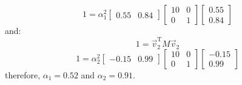 \documentclass[12pt,letter]{article}
\begin{document}
\begin{example}
	\begin{equation}
	1 = \alpha_1^2 \begin{bmatrix} 0.55 &  0.84 \end{bmatrix} \begin{bmatrix} 10 & 0 \\    0  & 1 \end{bmatrix}  \begin{bmatrix} 0.55 \\  0.84 \end{bmatrix}
	\end{equation}
	and:
	\begin{equation}
	1 = \vec{v}_2^\text{T} M \vec{v}_2 
	\end{equation}
	\begin{equation}
	1 = \alpha_2^2 \begin{bmatrix} -0.15 &  0.99 \end{bmatrix} \begin{bmatrix} 10 & 0 \\    0  & 1 \end{bmatrix}  \begin{bmatrix} -0.15 \\  0.99 \end{bmatrix}
	\end{equation}
	therefore, $\alpha_1=0.52$ and $\alpha_2=0.91$.


\end{example}
\end{document}
